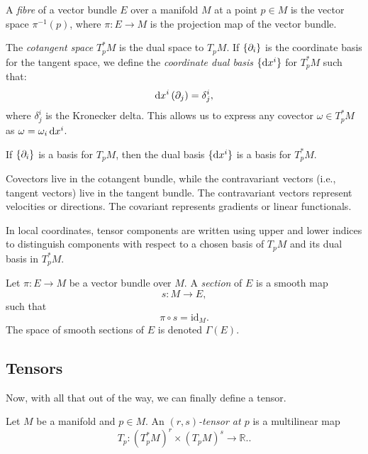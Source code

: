 \begin{definition}
  A \emph{fibre} of a vector bundle $E$ over a manifold $M$ at a point $p \in M$ is the vector space $\pi^{-1}(p)$, where $\pi : E \to M$ is the projection map of the vector bundle.
\end{definition}

\begin{definition}
  The \emph{cotangent space} $T_p^*M$ is the dual space to $T_pM$. If $\{\pd{i}\}$ is the coordinate basis for the tangent space, we define the \emph{coordinate dual basis} $\{ \dx^i \}$ for $T_p^*M$ such that:
  \[%
    \dx^i \left(\pd{j}\right) = \delta^i_j
  ,\]%
  where $\delta^i_j$ is the Kronecker delta. This allows us to express any covector $\omega \in T_p^*M$ as $\omega = \omega_i \dx^i$.
\end{definition}

\begin{note}
  If $\{\pd{i}\}$ is a basis for $T_pM$, then the dual basis $\{\dx^i\}$ is a basis for $T_p^*M$.
\end{note}

\begin{note}
  Covectors live in the cotangent bundle, while the contravariant vectors (i.e., tangent vectors) live in the tangent bundle. The contravariant vectors represent velocities or directions. The covariant represents gradients or linear functionals.
\end{note}

In local coordinates, tensor components are written using upper and lower indices to distinguish components with respect to a chosen basis of $T_pM$ and its dual basis in $T_p^*M$.

\begin{definition}
  Let $\pi : E \to M$ be a vector bundle over $M$. A \emph{section} of $E$ is a smooth map
  \[%
    s : M \to E
  ,\]%
  such that
  \[%
    \pi \circ s = \mathrm{id}_M
  .\]%
  The space of smooth sections of $E$ is denoted $\Gamma(E)$.
\end{definition}


\subsection{Tensors}

Now, with all that out of the way, we can finally define a tensor.

\begin{definition}
  Let $M$ be a manifold and $p \in M$. An \emph{$(r,s)$-tensor at $p$} is a multilinear map
  \[%
    T_p : (T_p^*M)^r \times (T_pM)^s \to \mathbb{R}.
  .\]%
\end{definition}

